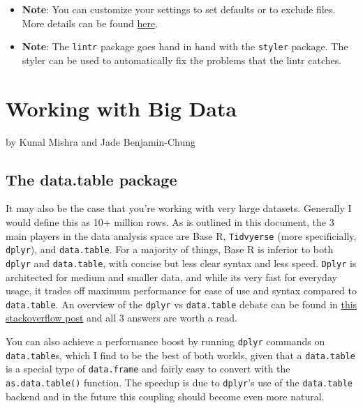 \documentclass[
]{book}
\providecommand{\tightlist}{%
  \setlength{\itemsep}{0pt}\setlength{\parskip}{0pt}}
\begin{document}
\begin{enumerate}
  \begin{itemize}
  \tightlist
  \item
    \textbf{Note}: You can customize your settings to set defaults or to exclude files. More details can be found \href{https://cran.r-project.org/web/packages/lintr/readme/README.html\#project-configuration}{here}.
  \item
    \textbf{Note}: The \texttt{lintr} package goes hand in hand with the \texttt{styler} package. The styler can be used to automatically fix the problems that the lintr catches.
  \end{itemize}
\end{enumerate}

\chapter{Working with Big Data}\label{working-with-big-data}

by Kunal Mishra and Jade Benjamin-Chung

\section{The data.table package}\label{the-data.table-package}

It may also be the case that you're working with very large datasets. Generally I would define this as 10+ million rows. As is outlined in this document, the 3 main players in the data analysis space are Base R, \texttt{Tidvyerse} (more specificially, \texttt{dplyr}), and \texttt{data.table}. For a majority of things, Base R is inferior to both \texttt{dplyr} and \texttt{data.table}, with concise but less clear syntax and less speed. \texttt{Dplyr} is architected for medium and smaller data, and while its very fast for everyday usage, it trades off maximum performance for ease of use and syntax compared to \texttt{data.table}. An overview of the \texttt{dplyr} vs \texttt{data.table} debate can be found in \href{https://stackoverflow.com/questions/21435339/data-table-vs-dplyr-can-one-do-something-well-the-other-cant-or-does-poorly/27840349\#27840349}{this stackoverflow post} and all 3 answers are worth a read.

You can also achieve a performance boost by running \texttt{dplyr} commands on \texttt{data.table}s, which I find to be the best of both worlds, given that a \texttt{data.table} is a special type of \texttt{data.frame} and fairly easy to convert with the \texttt{as.data.table()} function. The speedup is due to \texttt{dplyr}'s use of the \texttt{data.table} backend and in the future this coupling should become even more natural.
\end{document}
